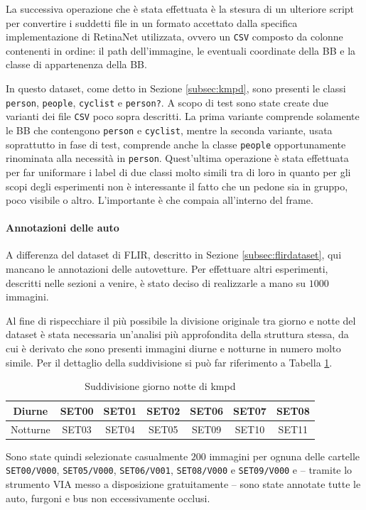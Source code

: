 La successiva operazione che è stata effettuata è la stesura di un ulteriore script per convertire i suddetti file in un formato accettato dalla specifica implementazione di RetinaNet utilizzata, ovvero un \texttt{CSV} composto da colonne contenenti in ordine: il path dell'immagine, le eventuali coordinate della \ac{BB} e la classe di appartenenza della \ac{BB}. 

In questo dataset, come detto in Sezione \ref{subsec:kmpd}, sono presenti le classi \texttt{person}, \texttt{people}, \texttt{cyclist} e \texttt{person?}. A scopo di test sono state create due varianti dei file \texttt{CSV} poco sopra descritti. La prima variante comprende solamente le \ac{BB} che contengono \texttt{person} e \texttt{cyclist}, mentre la seconda variante, usata soprattutto in fase di test, comprende anche la classe \texttt{people} opportunamente rinominata alla necessità in \texttt{person}. Quest'ultima operazione è stata effettuata per far uniformare i label di due classi molto simili tra di loro in quanto per gli scopi degli esperimenti non è interessante il fatto che un pedone sia in gruppo, poco visibile o altro. L'importante è che compaia all'interno del frame. 
\paragraph{Annotazioni delle auto}
A differenza del dataset di FLIR, descritto in Sezione \ref{subsec:flirdataset}, qui mancano le annotazioni delle autovetture. Per effettuare altri esperimenti, descritti nelle sezioni a venire, è stato deciso di realizzarle a mano su $1000$ immagini. 

Al fine di rispecchiare il più possibile la divisione originale tra giorno e notte del dataset è stata necessaria un'analisi più approfondita della struttura stessa, da cui è derivato che sono presenti immagini diurne e notturne in numero molto simile. Per il dettaglio della suddivisione si può far riferimento a Tabella \ref{table:day_night_kaist}.
\begin{table}[]
    \begin{tabular}{c|cccccc}
    Diurne & SET00 & SET01 & SET02 & SET06 & SET07 & SET08 \\ \hline
    Notturne & SET03 & SET04 & SET05 & SET09 & SET10 & SET11
    \end{tabular}
    \caption{Suddivisione giorno notte di \ac{kmpd}}
    \label{table:day_night_kaist}
\end{table}
Sono state quindi selezionate casualmente $200$ immagini per ognuna delle cartelle \texttt{SET00/V000}, \texttt{SET05/V000}, \texttt{SET06/V001}, \texttt{SET08/V000} e \texttt{SET09/V000} e -- tramite lo strumento \ac{VIA} \cite{dutta2019vgg, dutta2016via} messo a disposizione gratuitamente -- sono state annotate tutte le auto, furgoni e bus non eccessivamente occlusi. 

